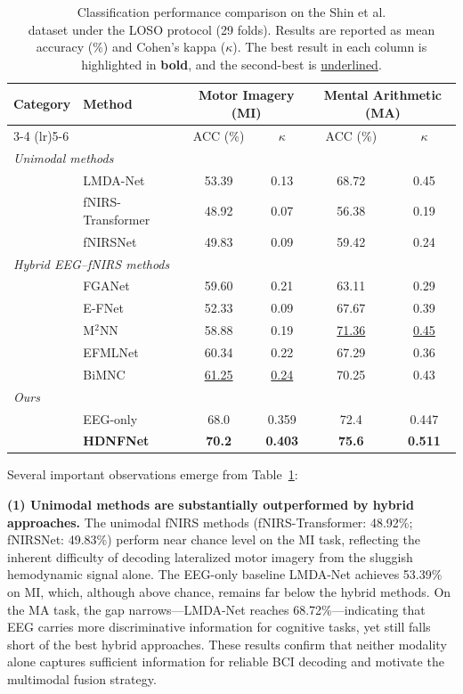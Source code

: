 \documentclass[preprint,12pt,authoryear]{elsarticle}
\begin{document}
\begin{table}[t]
\centering
\caption{Classification performance comparison on the Shin et al.\\ dataset under the LOSO protocol (29 folds). Results are reported as mean accuracy (\%) and Cohen's kappa ($\kappa$). The best result in each column is highlighted in \textbf{bold}, and the second-best is \underline{underlined}.}
\label{tab:performance}
\small
\begin{tabular}{llcccc}
\hline
\multirow{2}{*}{Category} & \multirow{2}{*}{Method} & \multicolumn{2}{c}{Motor Imagery (MI)} & \multicolumn{2}{c}{Mental Arithmetic (MA)} \\
\cmidrule(lr){3-4} \cmidrule(lr){5-6}
 & & ACC (\%) & $\kappa$ & ACC (\%) & $\kappa$ \\
\hline
\multicolumn{6}{l}{\textit{Unimodal methods}} \\
 & LMDA-Net              & 53.39 & 0.13  & 68.72 & 0.45 \\
 & fNIRS-Transformer     & 48.92 & 0.07  & 56.38 & 0.19 \\
 & fNIRSNet              & 49.83 & 0.09  & 59.42 & 0.24 \\
\hline
\multicolumn{6}{l}{\textit{Hybrid EEG--fNIRS methods}} \\
 & FGANet                & 59.60 & 0.21  & 63.11 & 0.29 \\
 & E-FNet                & 52.33 & 0.09  & 67.67 & 0.39 \\
 & M$^2$NN               & 58.88 & 0.19  & \underline{71.36} & \underline{0.45} \\
 & EFMLNet               & 60.34 & 0.22  & 67.29 & 0.36 \\
 & BiMNC                 & \underline{61.25} & \underline{0.24}  & 70.25 & 0.43 \\
\hline
\multicolumn{6}{l}{\textit{Ours}} \\
 & EEG-only              & 68.0  & 0.359 & 72.4  & 0.447 \\
 & \textbf{HDNFNet}      & \textbf{70.2}  & \textbf{0.403} & \textbf{75.6}  & \textbf{0.511} \\
\hline
\end{tabular}
\end{table}

Several important observations emerge from Table~\ref{tab:performance}:

\noindent\textbf{(1) Unimodal methods are substantially outperformed by hybrid approaches.} The unimodal fNIRS methods (fNIRS-Transformer: 48.92\%; fNIRSNet: 49.83\%) perform near chance level on the MI task, reflecting the inherent difficulty of decoding lateralized motor imagery from the sluggish hemodynamic signal alone. The EEG-only baseline LMDA-Net achieves 53.39\% on MI, which, although above chance, remains far below the hybrid methods. On the MA task, the gap narrows---LMDA-Net reaches 68.72\%---indicating that EEG carries more discriminative information for cognitive tasks, yet still falls short of the best hybrid approaches. These results confirm that neither modality alone captures sufficient information for reliable BCI decoding and motivate the multimodal fusion strategy.
\end{document}
